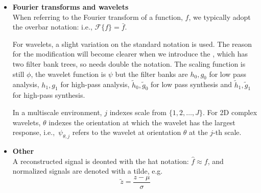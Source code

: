 \begin{itemize}
  \item \textbf{Fourier transforms and wavelets}\\
    When referring to the Fourier transform of a function, $f$, we typically
    adopt the overbar notation: i.e., $\mathcal{F}\{f\} = \bar{f}$. 

    For wavelets, a slight variation on the standard notation is used. The
    reason for the modification will become clearer when we introduce the
    \DTCWT, which has two filter bank trees, so needs double the notation. The scaling
    function is still $\phi$, the wavelet function is $\psi$ but the filter banks are
    $h_0, g_0$ for low pass analysis, $h_1, g_1$ for high-pass analysis,
    $\tilde{h}_0, \tilde{g}_0$ for low pass synthesis and $\tilde{h}_1,
    \tilde{g}_1$ for high-pass synthesis. 
    
    In a multiscale environment, $j$ indexes
    scale from $\{1,2, \ldots, J\}$. For 2D complex wavelets, $\theta$ indexes the
    orientation at which the wavelet has the largest response, i.e.,\ $\psi_{\theta, j}$
    refers to the wavelet at orientation $\theta$ at the $j$-th scale.

  \item \textbf{Other}\\
    A reconstructed signal is deonted with the hat notation: $\hat{f} \approx
    f$, and normalized signals are denoted with a tilde, e.g.
    $$\tilde{z} = \frac{z-\mu}{\sigma}$$
    

\end{itemize}
